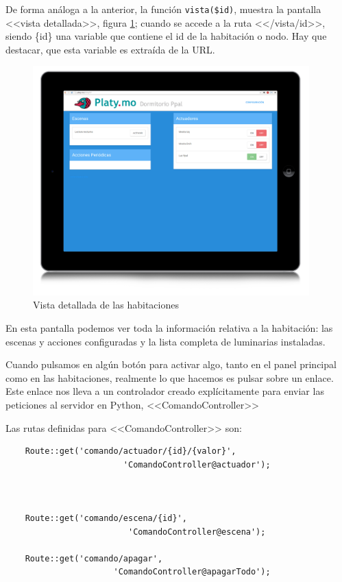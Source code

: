     De forma análoga a la anterior, la función \lstinline|vista($id)|, muestra la pantalla <<vista detallada>>, figura \ref{fig:vista_hab}; cuando se accede a la ruta <</vista/{id}>>, siendo \{id\} una variable que contiene el id de la habitación o nodo. Hay que destacar, que esta variable es extraída de la URL.
    
     \begin{figure}[htbp]
         \centering
         \includegraphics[width=0.95\textwidth]{imagenes/vista.jpg}
         \caption{Vista detallada de las habitaciones}
         \label{fig:vista_hab}
        \end{figure}
        
        
    En esta pantalla podemos ver toda la información relativa a la  habitación: las escenas y acciones configuradas y la lista completa de luminarias instaladas. 
    
    Cuando pulsamos en algún botón para activar algo, tanto en el panel principal como en las habitaciones, realmente lo que hacemos es pulsar sobre un enlace. Este enlace nos lleva a un controlador creado explícitamente para enviar las peticiones al servidor en Python, <<ComandoController>>
    
    Las rutas definidas para <<ComandoController>> son:
    \begin{lstlisting}
    Route::get('comando/actuador/{id}/{valor}',
                        'ComandoController@actuador');
                 
                 
                 
    Route::get('comando/escena/{id}',
                         'ComandoController@escena');
                 
    Route::get('comando/apagar', 
                      'ComandoController@apagarTodo');
    \end{lstlisting}
    
